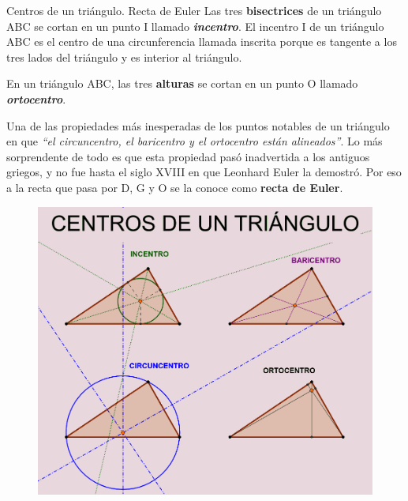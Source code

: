 \begin{myalertblock}{Centros de un triángulo. Recta de Euler}
\vspace{2mm} Las tres \textbf{bisectrices} de un triángulo ABC se cortan en un punto I llamado \textbf{\emph{incentro}}. El incentro I de un triángulo ABC es el centro de una circunferencia llamada inscrita porque es tangente a los tres lados del triángulo y es interior al triángulo.

\vspace{2mm} En un triángulo ABC, las tres \textbf{alturas} se cortan en un punto O llamado \textbf{\emph{ortocentro}}.

\vspace{4mm} Una de las propiedades más inesperadas de los puntos notables de un triángulo en que \emph{``el circuncentro, el baricentro y el ortocentro están alineados''}. Lo más sorprendente de todo es que esta propiedad pasó inadvertida a los antiguos griegos, y no fue hasta el siglo XVIII en que Leonhard Euler la demostró. Por eso a la recta que pasa por D, G y O se la conoce como \textbf{recta de Euler}.

\begin{figure}[H]
	\centering
	\includegraphics[width=.6\textwidth]{img-ga/ga25.png}
\end{figure}

\end{myalertblock}




